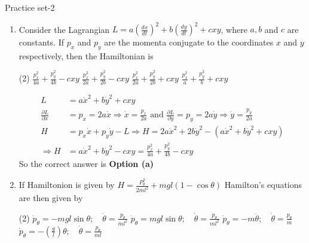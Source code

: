 \newpage
\begin{abox}
	Practice set-2
\end{abox}
\begin{enumerate}
	\item Consider the Lagrangian $L=a\left(\frac{d x}{d t}\right)^{2}+b\left(\frac{d y}{d t}\right)^{2}+c x y$, where $a, b$ and $c$ are constants. If $p_{x}$ and $p_{y}$ are the momenta conjugate to the coordinates $x$ and $y$ respectively, then the Hamiltonian is
	{}
	\begin{tasks}(2)
		\task[\textbf{a.}]$\frac{p_{x}^{2}}{4 a}+\frac{p_{y}^{2}}{4 b}-c x y$
		\task[\textbf{b.}]$\frac{p_{x}^{2}}{2 a}+\frac{p_{y}^{2}}{2 b}-c x y$
		\task[\textbf{c.}]$\frac{p_{x}^{2}}{2 a}+\frac{p_{y}^{2}}{2 b}+c x y$
		\task[\textbf{d.}] $\frac{p_{x}^{2}}{a}+\frac{p_{y}^{2}}{b}+c x y$
	\end{tasks}
\begin{answer}
	\begin{align*}
	L&=a \dot{x}^{2}+b \dot{y}^{2}+c x y\\
	\frac{\partial L}{\partial \dot{x}}&=p_{x}=2 a \dot{x} \Rightarrow \dot{x}=\frac{p_{x}}{2 a} \text { and } \frac{\partial L}{\partial \dot{y}}=p_{y}=2 a \dot{y} \Rightarrow \dot{y}=\frac{p_{y}}{2 a} \\
	H&=p_{x} \dot{x}+p_{y} \dot{y}-L \Rightarrow H=2 a \dot{x}^{2}+2 b \dot{y}^{2}-\left(a \dot{x}^{2}+b \dot{y}^{2}+c x y\right) \\
	\Rightarrow H&=a \dot{x}^{2}+b \dot{y}^{2}-c x y=\frac{p_{x}^{2}}{4 a}+\frac{p_{y}^{2}}{4 b}-c x y
	\end{align*}
		So the correct answer is \textbf{Option (a)}
\end{answer}
	\item  If Hamiltonion is given by $H=\frac{P_{\theta}^{2}}{2 m l^{2}}+m g l(1-\cos \theta)$ Hamilton's equations are then given by
	{}
	\begin{tasks}(2)
		\task[\textbf{a.}] $\dot{p}_{\theta}=-m g l \sin \theta ; \quad \dot{\theta}=\frac{p_{\theta}}{m l^{2}}$
		\task[\textbf{b.}]$\dot{p}_{\theta}=m g l \sin \theta ; \quad \dot{\theta}=\frac{p_{\theta}}{m l^{2}}$
		\task[\textbf{c.}]$\dot{p}_{\theta}=-m \ddot{\theta} ; \quad \dot{\theta}=\frac{p_{\theta}}{m}$
		\task[\textbf{d.}] $\dot{p}_{\theta}=-\left(\frac{g}{l}\right) \theta ; \quad \dot{\theta}=\frac{p_{\theta}}{m l}$
	\end{tasks}
\begin{answer}
	\begin{align*}

\end{align*}
\end{answer}
\end{enumerate}
